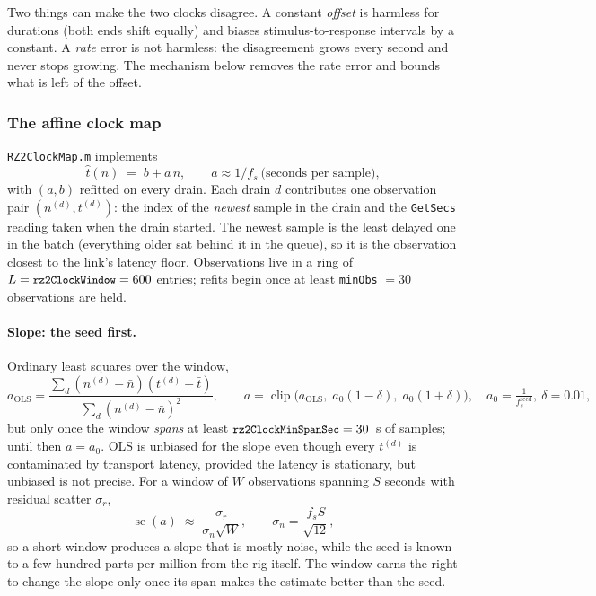 \documentclass[11pt,a4paper]{article}
\newcommand{\code}[1]{\texttt{\small #1}}
\newcommand{\file}[1]{\texttt{\small #1}}
\begin{document}
Two things can make the two clocks disagree. A constant \emph{offset} is
harmless for durations (both ends shift equally) and biases
stimulus-to-response intervals by a constant. A \emph{rate} error is not
harmless: the disagreement grows every second and never stops growing. The
mechanism below removes the rate error and bounds what is left of the offset.

\subsubsection{The affine clock map}

\file{RZ2ClockMap.m} implements
\begin{equation}
  \hat t(n) \;=\; b + a\,n, \qquad a \approx 1/f_s \ \text{(seconds per sample)},
  \label{eq:affine}
\end{equation}
with $(a,b)$ refitted on every drain. Each drain $d$ contributes one observation
pair $(n^{(d)}, t^{(d)})$: the index of the \emph{newest} sample in the drain and
the \code{GetSecs} reading taken when the drain started. The newest sample is
the least delayed one in the batch (everything older sat behind it in the
queue), so it is the observation closest to the link's latency floor.
Observations live in a ring of $L = \code{rz2ClockWindow} = 600$ entries; refits
begin once at least \code{minObs} $=30$ observations are held.

\paragraph{Slope: the seed first.} Ordinary least squares over the window,
\begin{equation}
  a_{\mathrm{OLS}} = \frac{\sum_d (n^{(d)} - \bar n)(t^{(d)} - \bar t)}
                          {\sum_d (n^{(d)} - \bar n)^2},
  \qquad
  a = \operatorname{clip}\!\big(a_{\mathrm{OLS}},\; a_0(1-\delta),\; a_0(1+\delta)\big),
  \quad a_0 = \tfrac{1}{f_s^{\text{seed}}},\ \delta = 0.01,
  \label{eq:slope}
\end{equation}
but only once the window \emph{spans} at least
$\code{rz2ClockMinSpanSec} = 30$~s of samples; until then $a = a_0$. OLS is
unbiased for the slope even though every $t^{(d)}$ is contaminated by transport
latency, provided the latency is stationary, but unbiased is not precise. For a
window of $W$ observations spanning $S$ seconds with residual scatter
$\sigma_r$,
\begin{equation}
  \operatorname{se}(a) \;\approx\; \frac{\sigma_r}{\sigma_n \sqrt{W}},
  \qquad
  \sigma_n = \frac{f_s S}{\sqrt{12}},
  \label{eq:se}
\end{equation}
so a short window produces a slope that is mostly noise, while the seed is
known to a few hundred parts per million from the rig itself. The window earns
the right to change the slope only once its span makes the estimate better than
the seed.
\end{document}
